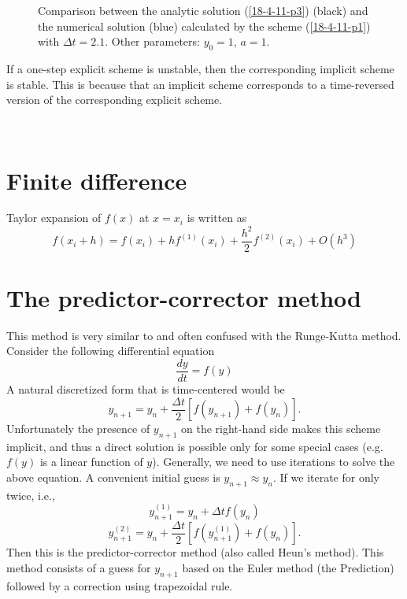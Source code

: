 \documentclass{article}
\begin{document}
\begin{figure}[h]
  \caption{\label{18-4-11-p2}Comparison between the analytic solution
  (\ref{18-4-11-p3}) (black) and the numerical solution (blue) calculated by
  the scheme (\ref{18-4-11-p1}) with $\Delta t = 2.1$. Other parameters: $y_0
  = 1$, $a = 1$.}
\end{figure}

If a one-step explicit scheme is unstable, then the corresponding implicit
scheme is stable. This is because that an implicit scheme corresponds to a
time-reversed version of the corresponding explicit scheme.

\

\section{Finite difference}

Taylor expansion of $f (x)$ at $x = x_i$ is written as
\begin{equation}
  f (x_i + h) = f (x_i) + h f^{(1)} (x_i) + \frac{h^2}{2} f^{(2)} (x_i) + O
  (h^3)
\end{equation}


\section{The predictor-corrector method}

This method is very similar to and often confused with the Runge-Kutta method.
Consider the following differential equation
\begin{equation}
  \frac{d y}{d t} = f (y)
\end{equation}
A natural discretized form that is time-centered would be
\begin{equation}
  y_{n + 1} = y_n + \frac{\Delta t}{2} [f (y_{n + 1}) + f (y_n)] .
\end{equation}
Unfortunately the presence of $y_{n + 1}$ on the right-hand side makes this
scheme implicit, and thus a direct solution is possible only for some special
cases (e.g. $f (y)$ is a linear function of $y$). Generally, we need to use
iterations to solve the above equation. A convenient initial guess is $y_{n +
1} \approx y_n$. If we iterate for only twice, i.e.,
\begin{equation}
  y_{n + 1}^{(1)} = y_n + \Delta t f (y_n)
\end{equation}
\begin{equation}
  y_{n + 1}^{(2)} = y_n + \frac{\Delta t}{2} [f (y_{n + 1}^{(1)}) + f (y_n)] .
\end{equation}
Then this is the predictor-corrector method (also called Heun's method). This
method consists of a guess for $y_{n + 1}$ based on the Euler method (the
Prediction) followed by a correction using trapezoidal rule.
\end{document}
